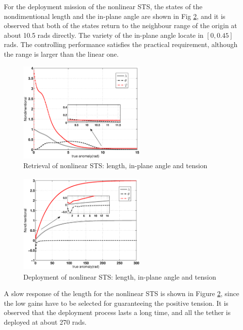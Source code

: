 \documentclass[conference]{IEEEtran}
\theoremstyle{plain}
\begin{document}
For the deployment mission of the nonlinear STS, the states of the nondimentional length and the in-plane angle are shown in Fig \ref{fig:Deployment of nonlinearization}, and it is observed that both of the states return to the neighbour range of the origin at about 10.5 rads directly. The variety of the in-plane angle locate in $[0, 0.45]$ rads. The controlling performance satisfies the practical requirement, although the range is larger than the linear one.\par
\begin{figure}
\centering
\includegraphics[width=180pt,height=144pt]{lyapunov_retrieval.eps}
\caption{Retrieval of nonlinear STS: length, in-plane angle and tension}
\label{fig:Retrieval of nonlinearization}
\end{figure}
\begin{figure}
\centering
\includegraphics[width=180pt,height=144pt]{lyapunov_deployment.eps}
\caption{Deployment of nonlinear STS: length, in-plane angle and tension}
\label{fig:Deployment of nonlinearization}
\end{figure}
A slow response of the length for the nonlinear STS is shown in Figure \ref{fig:Deployment of nonlinearization}, since the low gains have to be selected for guaranteeing the positive tension. It is observed that the deployment process lasts a long time, and all the tether is deployed at about 270 rads.
\end{document}
